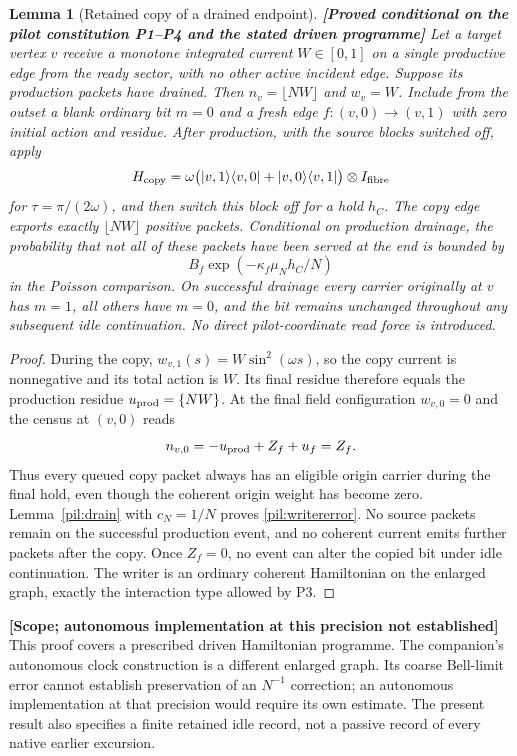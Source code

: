\documentclass[11pt,a4paper]{article}
\newtheorem{lemma}[theorem]{Lemma}
\theoremstyle{definition}
\theoremstyle{remark}\newtheorem{remark}[theorem]{Remark}
\newcommand{\status}[1]{\textbf{[#1]}\quad}
\begin{document}
\begin{lemma}[Retained copy of a drained endpoint]\label{pil:writer}
\status{Proved conditional on the pilot constitution P1--P4 and the stated driven programme}
Let a target vertex $v$ receive a monotone integrated current $W\in[0,1]$ on a single productive edge from the ready sector, with no other active incident edge. Suppose its production packets have drained. Then $n_v=\lfloor NW\rfloor$ and $w_v=W$. Include from the outset a blank ordinary bit $m=0$ and a fresh edge
$f: (v,0)\longrightarrow(v,1)$ with zero initial action and residue. After production, with the source blocks switched off, apply
\begin{equation}\label{pil:writerH}
 H_{\rm copy}=\omega\bigl(|v,1\rangle\langle v,0|+|v,0\rangle\langle v,1|\bigr)\otimes I_{\rm fibre}
\end{equation}
for $\tau=\pi/(2\omega)$, and then switch this block off for a hold $h_C$. The copy edge exports exactly $\lfloor NW\rfloor$ positive packets. Conditional on production drainage, the probability that not all of these packets have been served at the end is bounded by
\begin{equation}\label{pil:writererror}
 B_f\exp(-\kappa_f\mu_N h_C/N)
\end{equation}
in the Poisson comparison. On successful drainage every carrier originally at $v$ has $m=1$, all others have $m=0$, and the bit remains unchanged throughout any subsequent idle continuation. No direct pilot-coordinate read force is introduced.
\end{lemma}
\begin{proof}
During the copy, $w_{v,1}(s)=W\sin^2(\omega s)$, so the copy current is nonnegative and its total action is $W$. Its final residue therefore equals the production residue $u_{\rm prod}=\{NW\}$. At the final field configuration $w_{v,0}=0$ and the census at $(v,0)$ reads
\[
 n_{v,0}=-u_{\rm prod}+Z_f+u_f=Z_f.
\]
Thus every queued copy packet always has an eligible origin carrier during the final hold, even though the coherent origin weight has become zero. Lemma~\ref{pil:drain} with $c_N=1/N$ proves \eqref{pil:writererror}. No source packets remain on the successful production event, and no coherent current emits further packets after the copy. Once $Z_f=0$, no event can alter the copied bit under idle continuation. The writer is an ordinary coherent Hamiltonian on the enlarged graph, exactly the interaction type allowed by P3.
\end{proof}

\status{Scope; autonomous implementation at this precision not established}
This proof covers a prescribed driven Hamiltonian programme. The companion's autonomous clock construction is a different enlarged graph. Its coarse Bell-limit error cannot establish preservation of an $N^{-1}$ correction; an autonomous implementation at that precision would require its own estimate. The present result also specifies a finite retained idle record, not a passive record of every native earlier excursion.
\end{document}
